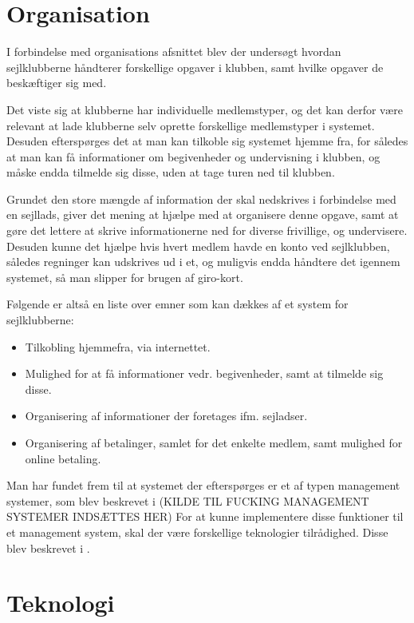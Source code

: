 \section{Organisation}

I forbindelse med organisations afsnittet blev der undersøgt hvordan sejlklubberne håndterer forskellige opgaver i klubben, samt hvilke opgaver de beskæftiger sig med. 

Det viste sig at klubberne har individuelle medlemstyper, og det kan derfor være relevant at lade klubberne selv oprette forskellige medlemstyper i systemet. Desuden efterspørges det at man kan tilkoble sig systemet hjemme fra, for således at man kan få informationer om begivenheder og undervisning i klubben, og måske endda tilmelde sig disse, uden at tage turen ned til klubben. 

Grundet den store mængde af information der skal nedskrives i forbindelse med en sejllads, giver det mening at hjælpe med at organisere denne opgave, samt at gøre det lettere at skrive informationerne ned for diverse frivillige, og undervisere. Desuden kunne det hjælpe hvis hvert medlem havde en konto ved sejlklubben, således regninger kan udskrives ud i et, og muligvis endda håndtere det igennem systemet, så man slipper for brugen af giro-kort.

Følgende er altså en liste over emner som kan dækkes af et system for sejlklubberne:

\begin{itemize}
	\item Tilkobling hjemmefra, via internettet.
	\item Mulighed for at få informationer vedr. begivenheder, samt at tilmelde sig disse.
	\item Organisering af informationer der foretages ifm. sejladser.
	\item Organisering af betalinger, samlet for det enkelte medlem, samt mulighed for online betaling.
\end{itemize}

Man har fundet frem til at systemet der efterspørges er et af typen management systemer, som blev beskrevet i (KILDE TIL FUCKING MANAGEMENT SYSTEMER INDSÆTTES HER)
For at kunne implementere disse funktioner til et management system, skal der være forskellige teknologier tilrådighed. Disse blev beskrevet i .

\section{Teknologi}

